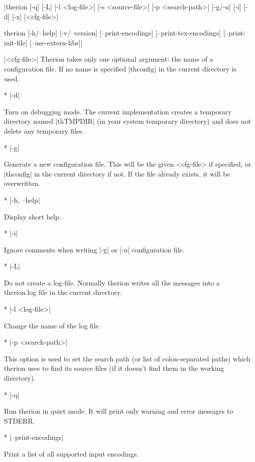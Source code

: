 |therion [-q] [-L] [-l <log-file>]
        [-s <source-file>] [-p <search-path>]
        [-g/-u] [-i] [-d] [-x] [<cfg-file>]

therion [-h/--help]
        [-v/--version]
        [--print-encodings]
        [--print-tex-encodings]
        [--print-init-file]
        [--use-extern-libs]|

\arguments
  |<cfg-file>| 
  Therion takes only one optional argument: the name of a configuration
  file. If no name is specified |thconfig| in the current directory is used. 
\endarguments

\options
* |-d|

  Turn on debugging mode. The current implementation creates a 
  temporary directory named |thTMPDIR| (in your system temporary 
  directory) and does not delete any temporary files. 

* |-g|

  Generate a new configuration file. This will be the given 
  <cfg-file> if specified, or |thconfig| in the current directory if not. 
  If the file already exists, it will be overwritten.
        
* |-h, --help|

        Display short help.

* |-i|

        Ignore comments when writing |-g| or |-u| configuration file.

* |-L|

        Do not create a log-file. Normally therion writes all the messages
        into a therion.log file in the current directory.
        
* |-l <log-file>|

        Change the name of the log file.
        
* |-p <search-path>|

        This option is used to set the search path (or list of 
	colon-separated paths) which therion uses to find its source
        files (if it doesn't find them in the working directory).

* |-q|

        Run therion in quiet mode. It will print only warning
        and error messages to STDERR.

* |--print-encodings|

        Print a list of all supported input encodings.
        
